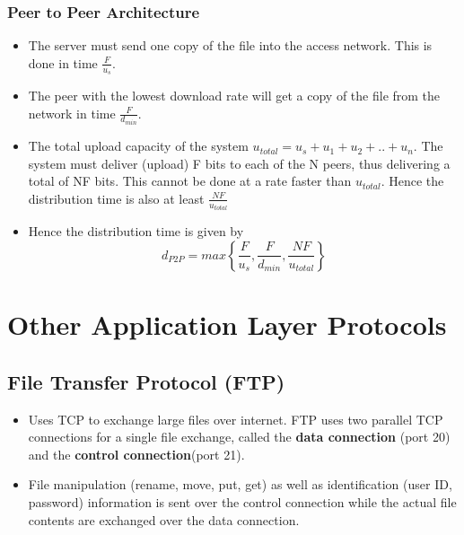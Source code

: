 \documentclass{article}
\theoremstyle{plain}
\theoremstyle{definition}
\begin{document}
\subsubsection{Peer to Peer Architecture}
\begin{itemize}
    \item The server must send one copy of the file into the access network. This is done in time $\frac{F}{u_s}$.
    
    \item The peer with the lowest download rate will get a copy of the file from the network in time $\frac{F}{d_{min}}$.
    
    \item The total upload capacity of the system $u_{total} = u_s + u_1 + u_2 + .. + u_n$. The system must deliver (upload) F bits to each of the N peers, thus delivering a total of NF bits. This cannot be done at a rate faster than $u_{total}$. Hence the distribution time is also at least $\frac{NF}{u_{total}}$
    
    \item Hence the distribution time is given by
    \begin{equation}
        d_{P2P} = max \left \{ \frac{F}{u_s}, \frac{F}{d_{min}}, \frac{NF}{u_{total}}  \right  \}
    \end{equation}
\end{itemize}

\section{Other Application Layer Protocols}

\subsection{File Transfer Protocol (FTP)}
\begin{itemize}
    \item Uses TCP to exchange large files over internet. FTP uses two parallel TCP connections for a single file exchange, called the \textbf{data connection} (port 20) and the \textbf{control connection}(port 21). 
    
    \item File manipulation (rename, move, put, get) as well as identification (user ID, password) information is sent over the control connection while the actual file contents are exchanged over the data connection. 
\end{itemize}
\end{document}
